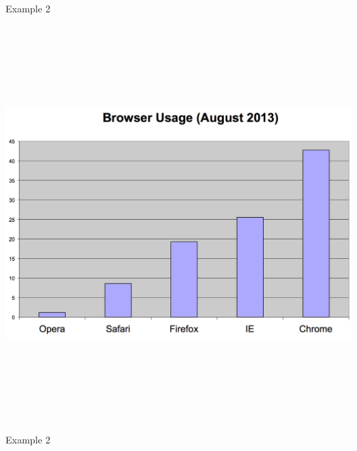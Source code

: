 \documentclass[12pt]{article}
\newcommand{\headsize}{\fontsize{35}{35} \selectfont}
\begin{document}
\newpage


\headsize \color{myyellow}
\hfill \begin{minipage}{5.75in}
\centering
Example 2
\end{minipage}

\vspace{30mm}

\centerline{\includegraphics[height=6in]{Figs/fig2a.png}}




\newpage


\headsize \color{myyellow}
\hfill \begin{minipage}{5.75in}
\centering
Example 2
\end{minipage}

\vspace{30mm}
\end{document}
